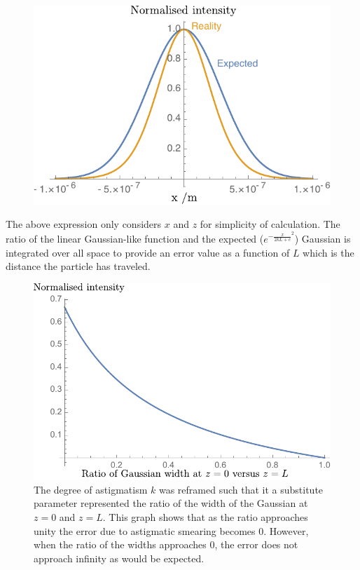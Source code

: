\begin{figure}
  \centering
  \includegraphics{./mathematica/Guassian_astig_half_both}
  \caption{}
  \label{}
\end{figure}

The above expression only considers $x$ and $z$ for simplicity of calculation.
The ratio of the linear Gaussian-like function and the expected ($e^{-\frac{x}{2kL+c}^2}$) Gaussian is integrated over all space to provide an error value as a function of $L$ which is the distance the particle has traveled.

\begin{figure}
  \includegraphics{./mathematica/Expected_versus_reality_error}
  \caption{The degree of astigmatism $k$ was reframed such that it a substitute parameter represented the ratio of the width of the Gaussian at $z=0$ and $z=L$.
  This graph shows that as the ratio approaches unity the error due to astigmatic smearing becomes $0$.
  However, when the ratio of the widths approaches 0, the error does not approach infinity as would be expected.
  }
  \label{fig:Expected_versus_reality_error}
\end{figure}

